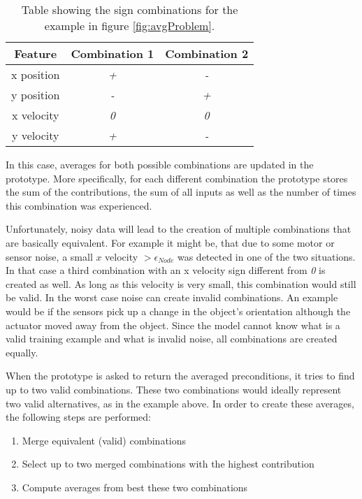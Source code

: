 \begin{table}
	\centering
	\begin{tabular}{|c|c|c|}
		\hline Feature & Combination 1 & Combination 2 \\ 
		\hline x position & \textit{+} & \textit{-} \\ 
		\hline y position & \textit{-} & \textit{+} \\ 
		\hline x velocity & \textit{0} & \textit{0} \\
		\hline y velocity & \textit{+} & \textit{-} \\ 
		\hline 
	\end{tabular} 
	\caption{Table showing the sign combinations for the example in figure \ref{fig:avgProblem}.}
	\label{tab:signCombinations}
\end{table}

In this case, averages for both possible combinations are updated in the prototype. More specifically, for each different combination the prototype stores the sum of the contributions, the sum of all inputs as well as the number of times this combination was experienced. 

Unfortunately, noisy data will lead to the creation of multiple combinations that are basically equivalent. For example it might be, that due to some motor or sensor noise, a small $x$ velocity $>\epsilon_{Node}$ was detected in one of the two situations. In that case a third combination with an x velocity sign different from \textit{0} is created as well. As long as this velocity is very small, this combination would still be valid. In the worst case noise can create invalid combinations. An example would be if the sensors pick up a change in the object's orientation although the actuator moved away from the object. Since the model cannot know what is a valid training example and what is invalid noise, all combinations are created equally.

When the prototype is asked to return the averaged preconditions, it tries to find up to two valid combinations. These two combinations would ideally represent two valid alternatives, as in the example above. 
In order to create these averages, the following steps are performed:
\begin{enumerate}
\item Merge equivalent (valid) combinations
\item Select up to two merged combinations with the highest contribution
\item Compute averages from best these two combinations
\end{enumerate}

